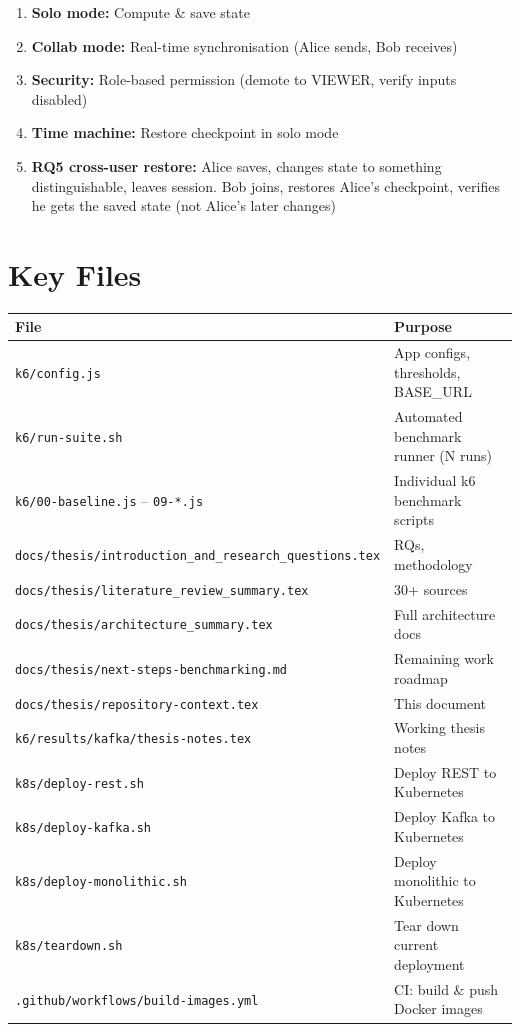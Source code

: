 \documentclass[12pt,a4paper]{article}
\begin{document}
\begin{enumerate}[nosep]
  \item \textbf{Solo mode:} Compute \& save state
  \item \textbf{Collab mode:} Real-time synchronisation (Alice sends, Bob receives)
  \item \textbf{Security:} Role-based permission (demote to VIEWER, verify inputs disabled)
  \item \textbf{Time machine:} Restore checkpoint in solo mode
  \item \textbf{RQ5 cross-user restore:} Alice saves, changes state to something
        distinguishable, leaves session. Bob joins, restores Alice's checkpoint,
        verifies he gets the saved state (not Alice's later changes)
\end{enumerate}

\section{Key Files}

\begin{table}[h]
\centering
\small
\begin{tabular}{@{}ll@{}}
\toprule
\textbf{File} & \textbf{Purpose} \\
\midrule
\texttt{k6/config.js}                    & App configs, thresholds, BASE\_URL \\
\texttt{k6/run-suite.sh}                 & Automated benchmark runner (N runs) \\
\texttt{k6/00-baseline.js} -- \texttt{09-*.js} & Individual k6 benchmark scripts \\
\texttt{docs/thesis/introduction\_and\_research\_questions.tex} & RQs, methodology \\
\texttt{docs/thesis/literature\_review\_summary.tex}            & 30+ sources \\
\texttt{docs/thesis/architecture\_summary.tex}                  & Full architecture docs \\
\texttt{docs/thesis/next-steps-benchmarking.md}                 & Remaining work roadmap \\
\texttt{docs/thesis/repository-context.tex}                     & This document \\
\texttt{k6/results/kafka/thesis-notes.tex}                      & Working thesis notes \\
\texttt{k8s/deploy-rest.sh}              & Deploy REST to Kubernetes \\
\texttt{k8s/deploy-kafka.sh}             & Deploy Kafka to Kubernetes \\
\texttt{k8s/deploy-monolithic.sh}        & Deploy monolithic to Kubernetes \\
\texttt{k8s/teardown.sh}                 & Tear down current deployment \\
\texttt{.github/workflows/build-images.yml} & CI: build \& push Docker images \\
\bottomrule
\end{tabular}
\end{table}
\end{document}
